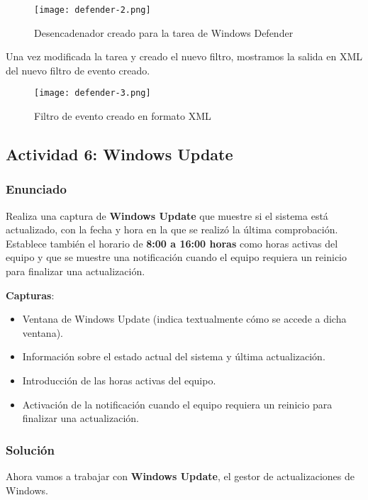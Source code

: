 \begin{enumerate}
    \begin{figure}[H]
        \centering
        \texttt{[image: defender-2.png]}
        \caption{Desencadenador creado para la tarea de Windows Defender}
    \end{figure}

    Una vez modificada la tarea y creado el nuevo filtro, mostramos la salida en XML del nuevo filtro de evento creado.

    \begin{figure}[H]
        \centering
        \texttt{[image: defender-3.png]}
        \caption{Filtro de evento creado en formato XML}
    \end{figure}
\end{enumerate}

\subsection{Actividad 6: Windows Update}

\subsubsection{Enunciado}
Realiza una captura de \textbf{Windows Update} que muestre si el sistema está actualizado, con la fecha y hora en la que se realizó la última comprobación. Establece también el horario de \textbf{8:00 a 16:00 horas} como horas activas del equipo y que se muestre una notificación cuando el equipo requiera un reinicio para finalizar una actualización.

\textbf{Capturas}:

\begin{itemize}
    \item Ventana de Windows Update (indica textualmente cómo se accede a dicha ventana).
    \item Información sobre el estado actual del sistema y última actualización.
    \item Introducción de las horas activas del equipo.
    \item Activación de la notificación cuando el equipo requiera un reinicio para finalizar una actualización.
\end{itemize}

\subsubsection{Solución}
Ahora vamos a trabajar con \textbf{Windows Update}, el gestor de actualizaciones de Windows.

